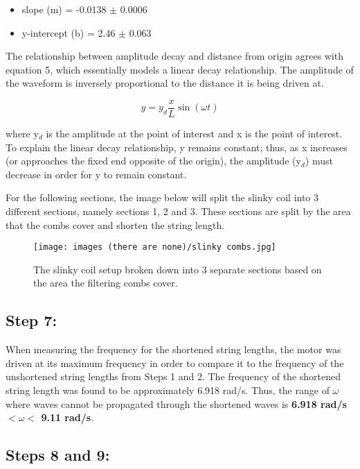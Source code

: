 \documentclass[12pt, letterpaper, twoside]{article}
\begin{document}
\begin{itemize}
    \item slope (m) = -0.0138 $\pm$ 0.0006
    \item y-intercept (b) = 2.46 $\pm$ 0.063
\end{itemize}

The relationship between amplitude decay and distance from origin agrees with equation 5, which essentially models a linear decay relationship. The amplitude of the waveform is inversely proportional to the distance it is being driven at.

\begin{equation}
    y = y_d\frac{x}{L}\sin{(\omega t)} 
\end{equation}

where y$_d$ is the amplitude at the point of interest and x is the point of interest. To explain the linear decay relationship, y remains constant; thus, as x increases (or approaches the fixed end opposite of the origin), the amplitude (y$_d$) must decrease in order for y to remain constant.


For the following sections, the image below will split the slinky coil into 3 different sections, namely sections 1, 2 and 3. These sections are split by the area that the combs cover and shorten the string length.

\begin{figure}[!ht]
    \centering
    \texttt{[image: images (there are none)/slinky combs.jpg]}
    \caption{The slinky coil setup broken down into 3 separate sections based on the area the filtering combs cover.}
    \label{fig:my_label}
\end{figure}
\vfill\pagebreak

\subsection{Step 7:}

When measuring the frequency for the shortened string lengths, the motor was driven at its maximum frequency in order to compare it to the frequency of the unshortened string lengths from Steps 1 and 2. The frequency of the shortened string length was found to be approximately 6.918 rad/s. Thus, the range of $\omega$ where waves cannot be propagated through the shortened waves is \textbf{6.918 rad/s $< \omega <$ 9.11 rad/s}.

\subsection{Steps 8 and 9:}
\end{document}
